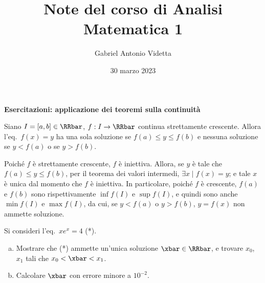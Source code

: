 \documentclass[11pt]{article}
\title{\textbf{Note del corso di Analisi Matematica 1}}
\author{Gabriel Antonio Videtta}
\date{30 marzo 2023}
\begin{document}
	
	\maketitle
	
	\wip
	
	\begin{center}
		\Large \textbf{Esercitazioni: applicazione dei teoremi sulla continuità}
	\end{center}

	\begin{exercise}
		Siano $I = [a, b] \in \RRbar$, $f : I \to \RRbar$ continua strettamente
		crescente. Allora l'eq.~$f(x)=y$ ha una sola soluzione se 
		$f(a) \leq y \leq f(b)$ e nessuna soluzione se $y < f(a)$ o
		se $y > f(b)$.
	\end{exercise}
	
	\begin{solution}
		Poiché $f$ è strettamente crescente, $f$ è iniettiva. Allora,
		se $y$ è tale che $f(a) \leq y \leq f(b)$, per il teorema
		dei valori intermedi, $\exists x \mid f(x) = y$; e tale $x$
		è unica dal momento che $f$ è iniettiva. In particolare, poiché $f$ è crescente,
		$f(a)$ e $f(b)$ sono rispettivamente $\inf f(I)$ e $\sup f(I)$, e
		quindi sono anche
		$\min f(I)$ e $\max f(I)$, da cui, se $y < f(a)$ o $y > f(b)$,
		$y=f(x)$ non ammette soluzione.
	\end{solution}

	\begin{exercise}
		Si consideri l'eq.~$xe^x = 4$ (*).
		
		\begin{enumerate}[(a)]
			\item Mostrare che (*) ammette un'unica soluzione $\xbar \in \RRbar$, e trovare $x_0$, $x_1$ tali che $x_0 < \xbar < x_1$.
			\item Calcolare $\xbar$ con errore minore a $10^{-2}$.
		\end{enumerate}		
	\end{exercise}
\end{document}
